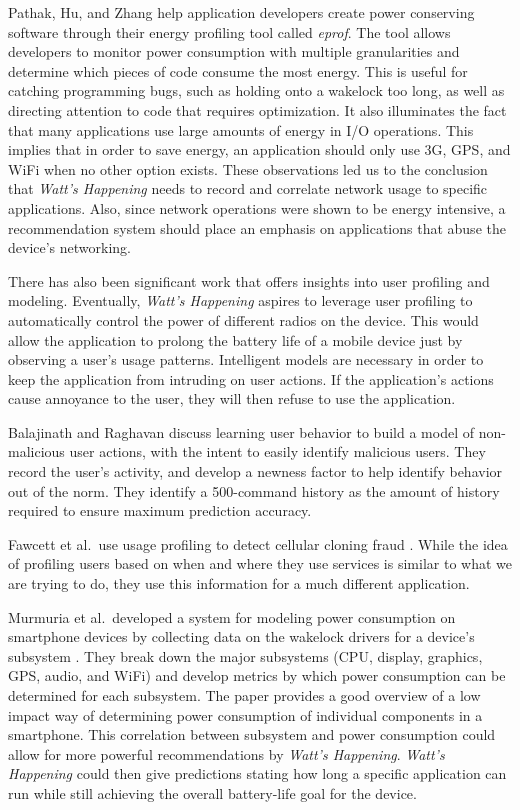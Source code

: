 Pathak, Hu, and Zhang help application developers create power conserving software through their energy profiling tool called \emph{eprof}\cite{Pathak:2012:ESI:2168836.2168841}. 
The tool allows developers to monitor power consumption with multiple granularities and determine which pieces of code consume the most energy. 
This is useful for catching programming bugs, such as holding onto a wakelock too long, as well as directing attention to code that requires optimization. 
It also illuminates the fact that many applications use large amounts of energy in I/O operations. 
This implies that in order to save energy, an application should only use 3G, GPS, and WiFi when no other option exists.
These observations led us to the conclusion that \emph{Watt's Happening} needs to record and correlate network usage to specific applications.
Also, since network operations were shown to be energy intensive, a recommendation system should place an emphasis on applications that abuse the device's networking.

There has also been significant work that offers insights into user profiling and modeling.
Eventually, \emph{Watt's Happening} aspires to leverage user profiling to automatically control the power of different radios on the device. 
This would allow the application to prolong the battery life of a mobile device just by observing a user's usage patterns.
Intelligent models are necessary in order to keep the application from intruding on user actions.
If the application's actions cause annoyance to the user, they will then refuse to use the application. 

Balajinath and Raghavan discuss learning user behavior to build a model of non-malicious user actions, with the intent to easily identify malicious users\cite{Balajinath:2001:IDT:2294491.2294970}. 
They record the user's activity, and develop a newness factor to help identify behavior out of the norm. 
They identify a 500-command history as the amount of history required to ensure maximum prediction accuracy. 

Fawcett et al.\ use usage profiling to detect cellular cloning fraud \cite{dataMiningFraudDetection}. 
While the idea of profiling users based on when and where they use services is similar to what we are trying to do, they use this information for a much different application. 

Murmuria et al.\ developed a system for modeling power consumption on smartphone devices by collecting data on the wakelock drivers for a device's subsystem \cite{mobilePowerUsageMeasurements}. 
They break down the major subsystems (CPU, display, graphics, GPS, audio, and WiFi) and develop metrics by which power consumption can be determined for each subsystem. 
The paper provides a good overview of a low impact way of determining power consumption of individual components in a smartphone.
This correlation between subsystem and power consumption could allow for more powerful recommendations by \emph{Watt's Happening}.
\emph{Watt's Happening} could then give predictions stating how long a specific application can run while still achieving the overall battery-life goal for the device.

